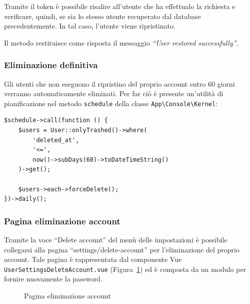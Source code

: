 Tramite il token \`e possibile risalire all'utente che ha effettualo la richiesta e verificare, quindi, se sia lo stesso utente recuperato dal database precedentemente.
In tal caso, l'utente viene ripristinato.

Il metodo restituisce come risposta il messaggio \textit{``User restored successfully''}.

\subsubsection{Eliminazione definitiva}
Gli utenti che non eseguono il ripristino del proprio account entro 60 giorni verranno automaticamente eliminati. Per far ci\`o \`e presente un'utilit\`a di pianificazione nel metodo \verb|schedule| della classe \verb|App\Console\Kernel|:

\begin{lstlisting}[caption={Utilit\`a di pianificazione per l'eliminazione definitiva degli utenti}, label={lst:user_hard_delete}]
$schedule->call(function () {
	$users = User::onlyTrashed()->where(
		'deleted_at',
		'<=',
		now()->subDays(60)->toDateTimeString()
	)->get();
	
	$users->each->forceDelete();
})->daily();
\end{lstlisting}

\subsubsection{Pagina eliminazione account}
Tramite la voce ``Delete account'' del men\`u delle impostazioni \`e possibile collegarsi alla pagina ``settings/delete-account'' per l'eliminazione del proprio account. Tale pagina \`e rappresentata dal componente Vue \verb|UserSettingsDeleteAccount.vue| (Figura~\ref{fig:user_settings_delete_account}) ed \`e composta da un modulo per fornire nuovamente la password.

\begin{figure}[htbp]
	\centering
	\fboxsep=0.5pt
	\fboxrule=0.5pt
	\caption{Pagina eliminazione account}
	\label{fig:user_settings_delete_account}
\end{figure}

